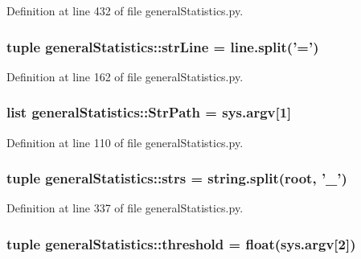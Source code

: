 \-Definition at line 432 of file general\-Statistics.\-py.

\hypertarget{namespacegeneral_statistics_aa452571aa8a33f2385c9129c6957624f}{
\subsubsection[{str\-Line}]{\setlength{\rightskip}{0pt plus 5cm}tuple {\bf general\-Statistics\-::str\-Line} = line.\-split('=')}}\label{namespacegeneral_statistics_aa452571aa8a33f2385c9129c6957624f}


\-Definition at line 162 of file general\-Statistics.\-py.

\hypertarget{namespacegeneral_statistics_a6f9e03e2d193c637dbe6f1f499a2f2ca}{
\subsubsection[{\-Str\-Path}]{\setlength{\rightskip}{0pt plus 5cm}list {\bf general\-Statistics\-::\-Str\-Path} = sys.\-argv\mbox{[}1\mbox{]}}}\label{namespacegeneral_statistics_a6f9e03e2d193c637dbe6f1f499a2f2ca}


\-Definition at line 110 of file general\-Statistics.\-py.

\hypertarget{namespacegeneral_statistics_ab65e4a0772acf69489feaf7a723dd18a}{
\subsubsection[{strs}]{\setlength{\rightskip}{0pt plus 5cm}tuple {\bf general\-Statistics\-::strs} = string.\-split(root, '{\bf \-\_\-}')}}\label{namespacegeneral_statistics_ab65e4a0772acf69489feaf7a723dd18a}


\-Definition at line 337 of file general\-Statistics.\-py.

\hypertarget{namespacegeneral_statistics_a155d64c28850cab0f82a1476f73c376d}{
\subsubsection[{threshold}]{\setlength{\rightskip}{0pt plus 5cm}tuple {\bf general\-Statistics\-::threshold} = float(sys.\-argv\mbox{[}2\mbox{]})}}\label{namespacegeneral_statistics_a155d64c28850cab0f82a1476f73c376d}


